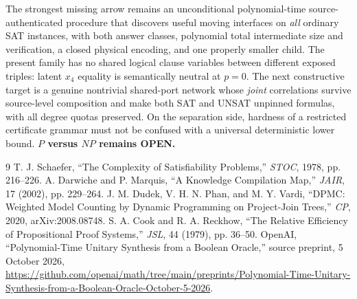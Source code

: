 \documentclass[11pt]{article}
\begin{document}
The strongest missing arrow remains an unconditional polynomial-time source-authenticated procedure that discovers useful moving interfaces on \emph{all} ordinary SAT instances, with both answer classes, polynomial total intermediate size and verification, a closed physical encoding, and one properly smaller child. The present family has no shared logical clause variables between different exposed triples: latent $x_4$ equality is semantically neutral at $p=0$. The next constructive target is a genuine nontrivial shared-port network whose \emph{joint} correlations survive source-level composition and make both SAT and UNSAT unpinned formulas, with all degree quotas preserved. On the separation side, hardness of a restricted certificate grammar must not be confused with a universal deterministic lower bound. \textbf{$P$ versus $NP$ remains OPEN.}

\begin{thebibliography}{9}
 T. J. Schaefer, ``The Complexity of Satisfiability Problems,'' \emph{STOC}, 1978, pp. 216--226.
 A. Darwiche and P. Marquis, ``A Knowledge Compilation Map,'' \emph{JAIR}, 17 (2002), pp. 229--264.
 J. M. Dudek, V. H. N. Phan, and M. Y. Vardi, ``DPMC: Weighted Model Counting by Dynamic Programming on Project-Join Trees,'' \emph{CP}, 2020, arXiv:2008.08748.
 S. A. Cook and R. A. Reckhow, ``The Relative Efficiency of Propositional Proof Systems,'' \emph{JSL}, 44 (1979), pp. 36--50.
 OpenAI, ``Polynomial-Time Unitary Synthesis from a Boolean Oracle,'' source preprint, 5 October 2026, \url{https://github.com/openai/math/tree/main/preprints/Polynomial-Time-Unitary-Synthesis-from-a-Boolean-Oracle-October-5-2026}.
\end{thebibliography}
\end{document}
